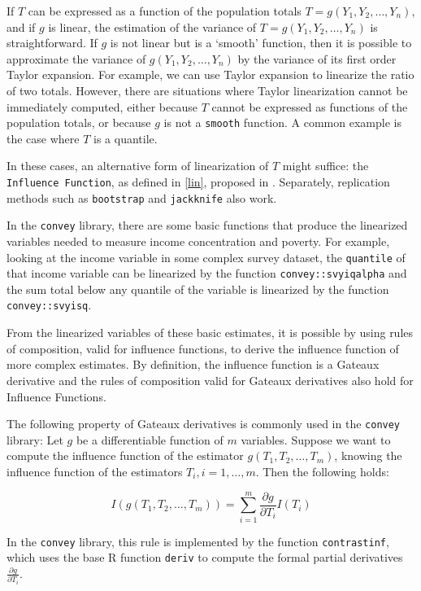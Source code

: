 \documentclass[
]{book}
\begin{document}
If \(T\) can be expressed as a function of the population totals \(T = g(Y_1, Y_2, \ldots, Y_n)\), and if \(g\) is linear, the estimation of the variance of \(T = g(Y_1, Y_2, \ldots, Y_n)\) is straightforward. If \(g\) is not linear but is a `smooth' function, then it is possible to approximate the variance of \(g(Y_1, Y_2, \ldots, Y_n)\) by the variance of its first order Taylor expansion. For example, we can use Taylor expansion to linearize the ratio of two totals. However, there are situations where Taylor linearization cannot be immediately computed, either because \(T\) cannot be expressed as functions of the population totals, or because \(g\) is not a \texttt{smooth} function. A common example is the case where \(T\) is a quantile.

In these cases, an alternative form of linearization of \(T\) might suffice: the \texttt{Influence\ Function}, as defined in \ref{lin}, proposed in \textcite{deville1999}. Separately, replication methods such as \texttt{bootstrap} and \texttt{jackknife} also work.

In the \texttt{convey} library, there are some basic functions that produce the linearized variables needed to measure income concentration and poverty. For example, looking at the income variable in some complex survey dataset, the \texttt{quantile} of that income variable can be linearized by the function \texttt{convey::svyiqalpha} and the sum total below any quantile of the variable is linearized by the function \texttt{convey::svyisq}.

From the linearized variables of these basic estimates, it is possible by using rules of composition, valid for influence functions, to derive the influence function of more complex estimates. By definition, the influence function is a Gateaux derivative and the rules of composition valid for Gateaux derivatives also hold for Influence Functions.

The following property of Gateaux derivatives is commonly used in the \texttt{convey} library: Let \(g\) be a differentiable function of \(m\) variables. Suppose we want to compute the influence function of the estimator \(g(T_1, T_2,\ldots, T_m)\), knowing the influence function of the estimators \(T_i, i=1,\ldots, m\). Then the following holds:

\[
I(g(T_1, T_2,\ldots, T_m)) = \sum_{i=1}^m \frac{\partial g}{\partial T_i}I(T_i)
\]

In the \texttt{convey} library, this rule is implemented by the function \texttt{contrastinf}, which uses the base R function \texttt{deriv} to compute the formal partial derivatives \(\frac{\partial g}{\partial T_i}\).
\end{document}
